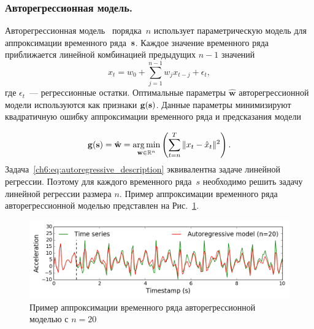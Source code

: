 \subsubsection{Авторегрессионная модель.}
Авторегрессионная модель~\cite{lukashin2003adaptive} порядка~$n$
использует параметрическую модель для аппроксимации временного ряда~$\mathbf{s}$. 
Каждое значение временного ряда приближается линейной комбинацией предыдущих $n-1$ значений
\begin{equation*}
	x_t = w_0 + \sum_{j=1}^{n-1} w_j x_{t-j} + \epsilon_t,
\end{equation*}
где $\epsilon_t$~--- регрессионные остатки.
Оптимальные параметры $\hat{\mathbf{w}}$ авторегрессионной модели используются как признаки $\mathbf{g}(\mathbf{s})$.
Данные параметры минимизируют квадратичную ошибку аппроксимации временного ряда и предсказания модели

\begin{equation}
	\mathbf{g}(\mathbf{s}) = \hat{\mathbf{w}} = \mathop{\arg \min}\limits_{\mathbf{w} \in \mathbb{R}^{n}} \left( \sum_{t=n}^{T} \|x_t - \hat{x}_t\|^2\right).
	\label{ch6:eq:autoregressive_description}
\end{equation}
Задача~\eqref{ch6:eq:autoregressive_description} эквивалентна задаче линейной регрессии.
Поэтому для каждого временного ряда~$s$ необходимо решить задачу линейной регрессии размера $n$.
Пример аппроксимации временного ряда авторегрессионной моделью представлен на Рис.~\ref{ch6:fig:ar_example}.

\begin{figure}[ht]
	\centering
	\includegraphics[width=1\linewidth]{figs/ch6/ar_example.png}
	\caption{Пример аппроксимации временного ряда авторегрессионной моделью с $n = 20$}
	\label{ch6:fig:ar_example}
\end{figure}

